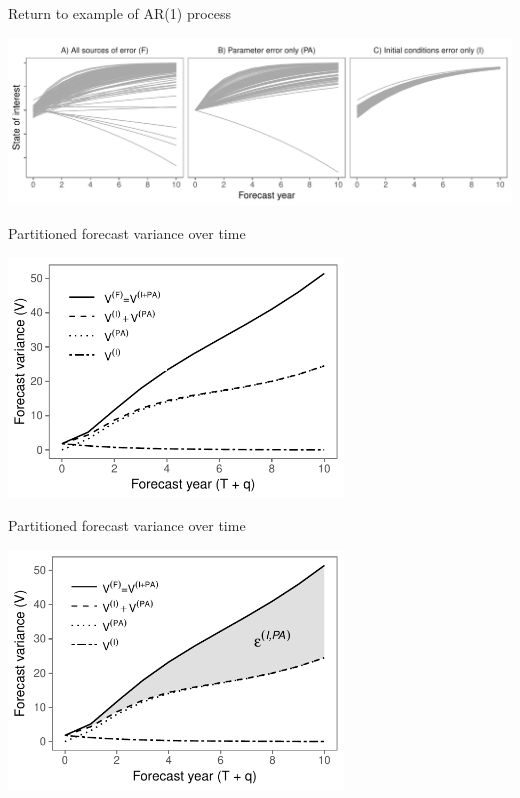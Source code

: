 \documentclass[12pt, compress, aspectratio=1610]{beamer}
\begin{document}
\begin{frame}{%
\protect\hypertarget{return-to-example-of-ar1-process}{%
Return to example of AR(1) process}}

\centering

\includegraphics[width=\textwidth]{./figures/forecast_uncertainty_example2.pdf}

\end{frame}

\begin{frame}{%
\protect\hypertarget{partitioned-forecast-variance-over-time}{%
Partitioned forecast variance over time}}

\centering

\includegraphics[height=2.5in]{./figures/example_interaction_effect_norib.pdf}

\end{frame}

\begin{frame}{%
\protect\hypertarget{partitioned-forecast-variance-over-time-1}{%
Partitioned forecast variance over time}}

\centering

\includegraphics[height=2.5in]{./figures/example_interaction_effect.pdf}

\end{frame}
\end{document}
